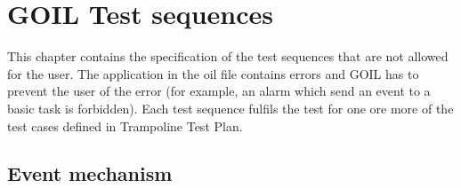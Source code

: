 \documentclass[10pt]{article}
\newlength{\Li}\settowidth{\Li}{Running}
\newlength{\Lii}\setlength{\Lii}{7cm}
\newlength{\Liiii}\setlength{\Liiii}{0.9cm}
\newlength{\Liii}\setlength{\Liii}{\textwidth} \addtolength{\Liii}{-\Li} \addtolength{\Liii}{-\Lii} \addtolength{\Liii}{-\Liiii}
\begin{document}
	
	
	
	
	
	
	
	
	
	
	
	
	
	
	
	
	
	
	
	
	
	
	
	
	
	
	
	
	
	
	
	
	
	
	
	
	
	
	
	
	
	
	
\newpage
\section{GOIL Test sequences}

	This chapter contains the specification of the test sequences that are not allowed for the user. The application in the oil file contains errors and GOIL has to prevent the user of the error (for example, an alarm which send an event to a basic task is forbidden). Each test sequence fulfils the test for one ore more of the test cases defined in Trampoline Test Plan. \\

\setlength{\Li}{7cm}
\setlength{\Liii}{0.9cm}
\setlength{\Lii}{\textwidth} \addtolength{\Lii}{-\Liii} \addtolength{\Lii}{-\Li}
\tabletail{ \hline } 
\tablelasttail{}

\subsection{Event mechanism}
\end{document}
